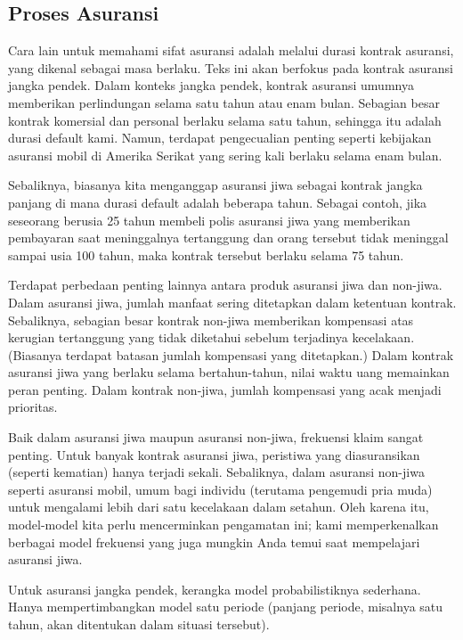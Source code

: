 \documentclass[
]{book}
\begin{document}
\hypertarget{proses-asuransi}{%
\subsection{Proses Asuransi}\label{proses-asuransi}}

Cara lain untuk memahami sifat asuransi adalah melalui durasi kontrak asuransi, yang dikenal sebagai masa berlaku. Teks ini akan berfokus pada kontrak asuransi jangka pendek. Dalam konteks jangka pendek, kontrak asuransi umumnya memberikan perlindungan selama satu tahun atau enam bulan. Sebagian besar kontrak komersial dan personal berlaku selama satu tahun, sehingga itu adalah durasi default kami. Namun, terdapat pengecualian penting seperti kebijakan asuransi mobil di Amerika Serikat yang sering kali berlaku selama enam bulan.

Sebaliknya, biasanya kita menganggap asuransi jiwa sebagai kontrak jangka panjang di mana durasi default adalah beberapa tahun. Sebagai contoh, jika seseorang berusia 25 tahun membeli polis asuransi jiwa yang memberikan pembayaran saat meninggalnya tertanggung dan orang tersebut tidak meninggal sampai usia 100 tahun, maka kontrak tersebut berlaku selama 75 tahun.

Terdapat perbedaan penting lainnya antara produk asuransi jiwa dan non-jiwa. Dalam asuransi jiwa, jumlah manfaat sering ditetapkan dalam ketentuan kontrak. Sebaliknya, sebagian besar kontrak non-jiwa memberikan kompensasi atas kerugian tertanggung yang tidak diketahui sebelum terjadinya kecelakaan. (Biasanya terdapat batasan jumlah kompensasi yang ditetapkan.) Dalam kontrak asuransi jiwa yang berlaku selama bertahun-tahun, nilai waktu uang memainkan peran penting. Dalam kontrak non-jiwa, jumlah kompensasi yang acak menjadi prioritas.

Baik dalam asuransi jiwa maupun asuransi non-jiwa, frekuensi klaim sangat penting. Untuk banyak kontrak asuransi jiwa, peristiwa yang diasuransikan (seperti kematian) hanya terjadi sekali. Sebaliknya, dalam asuransi non-jiwa seperti asuransi mobil, umum bagi individu (terutama pengemudi pria muda) untuk mengalami lebih dari satu kecelakaan dalam setahun. Oleh karena itu, model-model kita perlu mencerminkan pengamatan ini; kami memperkenalkan berbagai model frekuensi yang juga mungkin Anda temui saat mempelajari asuransi jiwa.

Untuk asuransi jangka pendek, kerangka model probabilistiknya sederhana. Hanya mempertimbangkan model satu periode (panjang periode, misalnya satu tahun, akan ditentukan dalam situasi tersebut).
\end{document}

